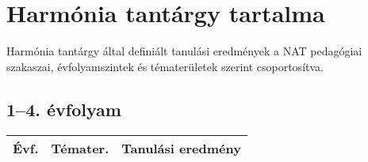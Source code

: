 
\section{Harmónia tantárgy tartalma }
Harmónia tantárgy által definiált tanulási eredmények a NAT pedagógiai szakaszai, évfolyamszintek és tématerületek szerint csoportosítva.

\subsection{1–4. évfolyam}
\begin{small}
  \begin{longtable}{c | p{2cm} |  p{11cm} }
    \textbf{Évf.} & \textbf{Témater.} & \textbf{Tanulási eredmény} \\ \hline \hline
    \endhead


\end{longtable}
\end{small}
